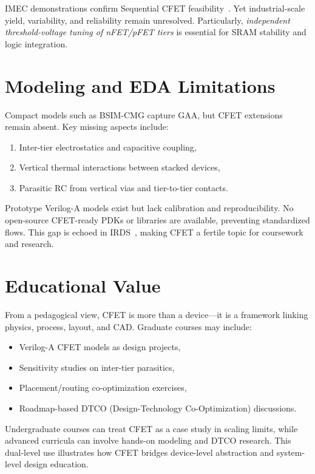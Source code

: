 \documentclass[conference]{IEEEtran}
\begin{document}
IMEC demonstrations confirm Sequential CFET feasibility~\cite{imec_cfet_iedm2020}.
Yet industrial-scale yield, variability, and reliability remain unresolved.
Particularly, \emph{independent threshold-voltage tuning of nFET/pFET tiers} is essential for SRAM stability and logic integration.

\section{Modeling and EDA Limitations}
Compact models such as BSIM-CMG capture GAA, but CFET extensions remain absent.
Key missing aspects include:
\begin{enumerate}
  \item Inter-tier electrostatics and capacitive coupling,
  \item Vertical thermal interactions between stacked devices,
  \item Parasitic RC from vertical vias and tier-to-tier contacts.
\end{enumerate}
Prototype Verilog-A models exist but lack calibration and reproducibility.
No open-source CFET-ready PDKs or libraries are available, preventing standardized flows.
This gap is echoed in IRDS~\cite{irds_2023}, making CFET a fertile topic for coursework and research.

\section{Educational Value}
From a pedagogical view, CFET is more than a device—it is a framework linking physics, process, layout, and CAD.
Graduate courses may include:
\begin{itemize}
  \item Verilog-A CFET models as design projects,
  \item Sensitivity studies on inter-tier parasitics,
  \item Placement/routing co-optimization exercises,
  \item Roadmap-based DTCO (Design-Technology Co-Optimization) discussions.
\end{itemize}
Undergraduate courses can treat CFET as a case study in scaling limits, while advanced curricula can involve hands-on modeling and DTCO research.
This dual-level use illustrates how CFET bridges device-level abstraction and system-level design education.

\end{document}
